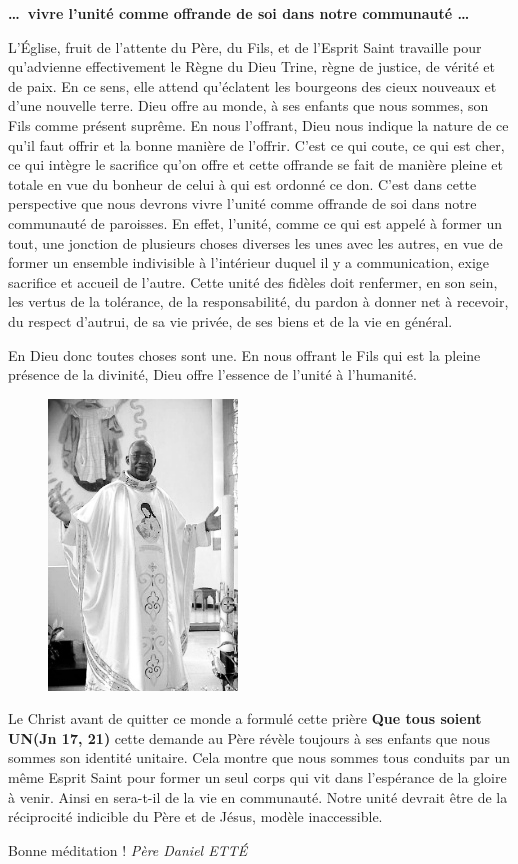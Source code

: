  \begin{center}
 \textbf{\dots\og vivre l’unité comme offrande de soi dans notre communauté \fg \dots}
 \end{center}
L’Église, fruit de l’attente du Père, du Fils, et de l’Esprit Saint travaille pour qu’advienne effectivement le Règne du Dieu Trine, règne de justice, de vérité et de paix.
En ce sens, elle attend qu’éclatent les bourgeons des cieux nouveaux et d’une nouvelle terre. Dieu offre au monde, à ses enfants que nous sommes, son Fils comme présent suprême. En nous l’offrant, Dieu nous indique la nature de ce qu’il faut offrir et la bonne manière de l’offrir. C’est ce qui coute, ce qui est cher, ce qui intègre le sacrifice qu’on offre et cette offrande se fait de manière pleine et totale en vue du bonheur de celui à qui est ordonné ce don.
C’est dans cette perspective que nous devrons vivre l’unité comme offrande de soi dans notre communauté de paroisses. En effet, l’unité, comme ce qui est appelé à former un tout, une jonction de plusieurs choses diverses les unes avec les autres, en vue de former un ensemble indivisible à l’intérieur duquel il y a communication, exige sacrifice et accueil de l’autre. Cette unité des fidèles doit renfermer, en son sein, les vertus de la tolérance, de la responsabilité, du pardon à donner net à recevoir, du respect d’autrui, de sa vie privée, de ses biens et de la vie en général.

En Dieu donc toutes choses sont une. En nous offrant le Fils qui est la pleine présence de la divinité, Dieu offre l’essence de l’unité à l’humanité.
\begin{figure}
\vspace{-0.5cm}
	\includegraphics{standing_daniel}
\end{figure}
Le Christ avant de quitter ce monde a formulé cette prière \textbf{\og Que tous soient UN\fg (Jn 17, 21)} cette demande au Père révèle toujours à ses enfants que nous sommes son identité unitaire.
Cela montre que nous sommes tous conduits par un même Esprit Saint pour former un seul corps qui vit dans l’espérance de la gloire à venir. Ainsi en sera-t-il de la vie en communauté. Notre unité devrait être de la réciprocité indicible du Père et de Jésus, modèle inaccessible. 

\begin{flushright}
Bonne méditation !
\textit{Père  Daniel  ETTÉ}
\end{flushright}


